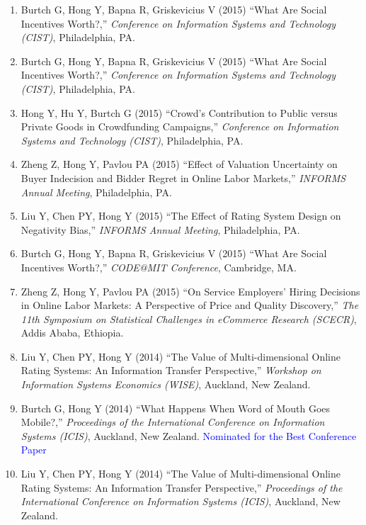 \documentclass[paper=letter,fontsize=10pt]{scrartcl} %
\newcommand{\ConfEntry}[6]{
		\noindent #1 (#2) ``#3,'' \textit{#4}, #5. \textcolor{blue}{#6}}
\newcommand{\Hong}{Hong Y}
\begin{document}
\begin{enumerate}
\item \ConfEntry{Burtch G, \Hong, Bapna R, Griskevicius V}{2015}{What Are Social Incentives Worth?}{Conference on Information Systems and Technology (CIST)}{Philadelphia, PA}{}

\item \ConfEntry{Burtch G, \Hong, Bapna R, Griskevicius V}{2015}{What Are Social Incentives Worth?}{Conference on Information Systems and Technology (CIST)}{Philadelphia, PA}{}

\item \ConfEntry{\Hong, Hu Y, Burtch G}{2015}{Crowd's Contribution to Public versus Private Goods in Crowdfunding Campaigns}{Conference on Information Systems and Technology (CIST)}{Philadelphia, PA}{}

\item \ConfEntry{Zheng Z, \Hong, Pavlou PA}{2015}{Effect of Valuation Uncertainty on Buyer Indecision and Bidder Regret in Online Labor Markets}{INFORMS Annual Meeting}{Philadelphia, PA}{}

\item \ConfEntry{Liu Y, Chen PY, \Hong}{2015}{The Effect of Rating System Design on Negativity Bias}{INFORMS Annual Meeting}{Philadelphia, PA}{}

\item \ConfEntry{Burtch G, \Hong, Bapna R, Griskevicius V}{2015}{What Are Social Incentives Worth?}{CODE{@}MIT Conference}{Cambridge, MA}{}

\item \ConfEntry{Zheng Z, \Hong, Pavlou PA}{2015}{On Service Employers' Hiring Decisions in Online Labor Markets: A Perspective of Price and Quality Discovery}{The 11th Symposium on Statistical Challenges in eCommerce Research (SCECR)}{Addis Ababa, Ethiopia}{}

\item \ConfEntry{Liu Y, Chen PY, \Hong}{2014}{The Value of Multi-dimensional Online Rating Systems: An Information Transfer Perspective}{Workshop on Information Systems Economics (WISE)}{Auckland, New Zealand}{}

\item \ConfEntry{Burtch G, \Hong}{2014}{What Happens When Word of Mouth Goes Mobile?}{Proceedings of the International Conference on Information Systems (ICIS)}{Auckland, New Zealand}{\protect\newline Nominated for the Best Conference Paper}

\item \ConfEntry{Liu Y, Chen PY, \Hong}{2014}{The Value of Multi-dimensional Online Rating Systems: An Information Transfer Perspective}{Proceedings of the International Conference on Information Systems (ICIS)}{Auckland, New Zealand}{}


\end{enumerate}
\end{document}
